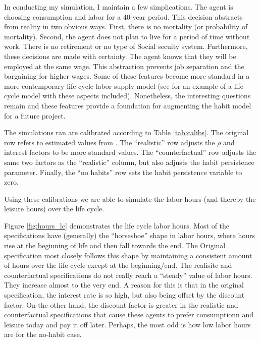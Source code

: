 \documentclass[ProjectMMD]{subfiles}
\begin{document}
In conducting my simulation, I maintain a few simplications. The agent is choosing consumption and labor for a 40-year period. This decision abstracts from reality in two obvious ways. First, there is no mortality (or probability of mortality). Second, the agent does not plan to live for a period of time without work. There is no retirement or no type of Social secuity system. Furthermore, these decisions are made with certainty. The agent knows that they will be employed at the same wage. This abstraction prevents job separation and the bargaining for higher wages. Some of these features become more standard in a more contemporary life-cycle labor supply model (see \cite{keane2016labour} for an example of a life-cycle model with these aspects included). Nonetheless, the interesting questions remain and these features provide a foundation for augmenting the habit model for a future project. 

The simulations ran are calibrated according to Table \ref{tab:calibs}. The original row refers to estimated values from \cite{bover1991relaxing}. The ``realistic'' row adjusts the $\rho$ and interest factors to be more standard values. The ``counterfactual'' row adjusts the same two factors as the ``realistic'' column, but also adjusts the habit persistence parameter. Finally, the ``no habits'' row sets the habit persistence variable to zero.

Using these calibrations we are able to simulate the labor hours (and thereby the leisure hours) over the life cycle.
\renewcommand{\figName}{hours_lc}
\renewcommand{\figFile}{\figName}
\hypertarget{\figFile}{}

Figure \ref{fig:hours_lc} demonstrates the life cycle labor hours. Most of the specifications have (generally) the ``horseshoe'' shape in labor hours, where hours rise at the beginning of life and then fall towards the end. The Original specification most closely follows this shape by maintaining a consistent amount of hours over the life cycle except at the beginning/end. The realisitc and counterfactual specifications do not really reach a ``steady'' value of labor hours. They increase almost to the very end. A reason for this is that in the original specification, the interest rate is so high, but also being offset by the discount factor. On the other hand, the discount factor is greater in the realistic and counterfactual specifications that cause these agents to prefer consumptionn and leisure today and pay it off later. Perhaps, the most odd is how low labor hours are for the no-habit case. 
\end{document}

